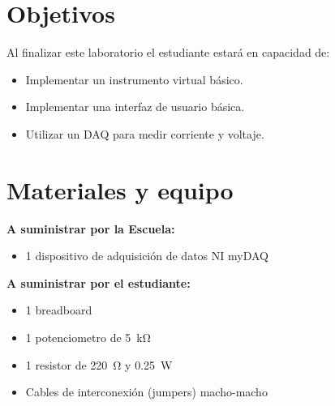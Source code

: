 \documentclass[12pt,letterpaper]{report}
\newcommand{\obj}{Objetivos}
\newcommand{\mat}{Materiales y equipo}
\newcommand{\capacidad}{Al finalizar este laboratorio el estudiante estará en capacidad de:}
\begin{document}
\section{\obj}
\capacidad
\begin{itemize}
\item Implementar un instrumento virtual básico.
\item Implementar una interfaz de usuario básica.
\item Utilizar un DAQ para medir corriente y voltaje.
\end{itemize}

\section{\mat}
\textbf{A suministrar por la Escuela:}
\begin{itemize}
\item 1 dispositivo de adquisición de datos NI myDAQ

\end{itemize}
\textbf{A suministrar por el estudiante:}
\begin{itemize}
\item 1 breadboard
\item 1 potenciometro de \SI{5}{\kilo\ohm}
\item 1 resistor de \SI{220}{\ohm} y \SI{0.25}{\watt}
\item Cables de interconexión (jumpers) macho-macho
\end{itemize}
\end{document}
